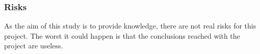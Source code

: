 \documentclass[a4paper]{article}
\begin{document}

            \subsubsection{Risks}

            As the aim of this study is to provide knowledge, there are not real risks for this project. The worst it could happen is that the conclusions reached with the project are useless.













\printbibliography
\end{document}
